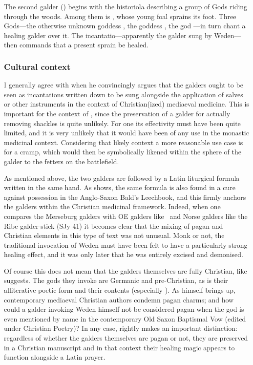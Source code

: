 The second galder (\MerseburgTwo) begins with the historiola describing a group of Gods riding through the woods.  Among them is , whose young foal sprains its foot.  Three Gods---the otherwise unknown goddess , the goddess , the god ---in turn chant a healing galder over it.  The incantatio---apparently the galder sung by Weden---then commands that a present sprain be healed.

\subsubsection{Cultural context}

I generally agree with \textcite{Murdoch1988} when he convincingly argues that the galders ought to be seen as incantations written down to be sung alongside the application of salves or other instruments in the context of Christian(ized) mediaeval medicine.  This is important for the context of \MerseburgOne, since the preservation of a galder for actually removing shackles is quite unlikely.  For one its effectivity must have been quite limited, and it is very unlikely that it would have been of any use in the monastic medicinal context.  Considering that likely context a more reasonable use case is for a cramp, which would then be symbolically likened within the sphere of the galder to the fetters on the battlefield.

As mentioned above, the two galders are followed by a Latin liturgical formula written in the same hand.  As \textcite[362--363]{Murdoch1988} shows, the same formula is also found in a cure against possession in the Anglo-Saxon Bald’s Leechbook, and this firmly anchors the galders within the Christian medicinal framework.
Indeed, when one compares the Merseburg galders with OE galders like \NineHerbs\ and Norse galders like the Ribe galder-stick (SJy 41) it becomes clear that the mixing of pagan and Christian elements in this type of text was not unusual.  Monk or not, the traditional invocation of Weden must have been felt to have a particularly strong healing effect, and it was only later that he was entirely excised and demonised.

Of course this does not mean that the galders themselves are fully Christian, like \textcite{Murdoch1988} suggests.  The gods they invoke are Germanic and pre-Christian, as is their alliterative poetic form and their contents (especially \MerseburgTwo).  As \textcite[360--361]{Murdoch1988} himself brings up, contemporary mediaeval Christian authors condemn pagan charms; and how could a galder invoking Weden himself not be considered pagan when the god is even mentioned by name in the contemporary Old Saxon Baptismal Vow (edited under Christian Poetry)?  In any case, \citeauthor{Murdoch1988} rightly makes an important distinction: regardless of whether the galders themselves are pagan or not, they are preserved in a Christian manuscript and in that context their healing magic appears to function alongside a Latin prayer.

